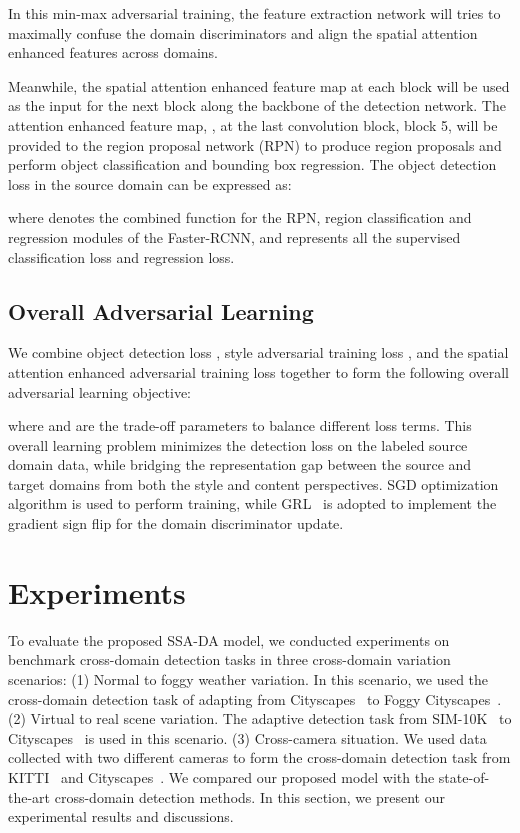 \documentclass[runningheads]{llncs}
\begin{document}
In this min-max adversarial training, 
the feature extraction network  will tries to maximally confuse the 
domain discriminators 
 and align the spatial attention enhanced features across domains. 



Meanwhile, the spatial attention enhanced feature map  at each block will be used as the input for the next block
along the backbone of the detection network. 
The attention enhanced feature map, , 
at the last convolution block, block 5, will be provided to the region proposal network (RPN) 
to produce region proposals and perform object classification and bounding box regression. 
The object detection loss  in the source domain can be expressed as:

where  denotes the combined function for the RPN, region classification and regression modules
of the Faster-RCNN, and  represents all the supervised classification loss and regression loss. 




\subsection{Overall Adversarial Learning}
We combine object detection loss , style adversarial training loss , 
and the spatial attention enhanced adversarial training loss  together to 
form the following overall adversarial learning objective:

where  and  are the trade-off parameters to balance different loss terms. 
This overall learning problem minimizes the detection loss on the labeled source domain data,
while bridging the representation gap between the source and target domains from both the style 
and content perspectives.
SGD optimization algorithm is used to perform training, while
GRL~\cite{ganin2016domain} is adopted to implement the gradient sign flip for the domain discriminator update. 




\section{Experiments}

To evaluate the proposed SSA-DA model, we conducted experiments 
on benchmark cross-domain detection tasks in three cross-domain variation scenarios: 
(1) {Normal to foggy weather variation}. 
In this scenario, we used the cross-domain detection task of adapting from
Cityscapes~\cite{cordts2016cityscapes} to Foggy Cityscapes~\cite{sakaridis2018semantic}.
(2) {Virtual to real scene variation}. The adaptive detection task from SIM-10K~\cite{JohnsonDriving} to Cityscapes~\cite{cordts2016cityscapes}
is used in this scenario. 
(3) {Cross-camera situation}. 
We used data collected with two different cameras to form the cross-domain detection task from KITTI~\cite{geiger2012we} and Cityscapes~\cite{cordts2016cityscapes}. 
We compared our proposed model with the state-of-the-art cross-domain detection methods. 
In this section, we present our experimental results and discussions. 
\end{document}
